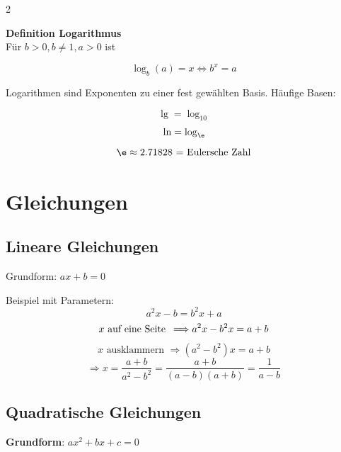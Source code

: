 \begin{multicols}{2}
\begin{tcolorbox}[colback=white]
  \textbf{Definition Logarithmus}\\
  Für $b>0, b\ne 1, a>0$ ist

$$\log_b{}(a)=x \Longleftrightarrow{} b^x = a$$
\end{tcolorbox}

Logarithmen sind Exponenten zu einer fest gewählten Basis. Häufige Basen:

$$\lg = \log_{10} $$
$$\ln = \log_{\e}$$
$$\e \approx 2.71828 \textrm{ = Eulersche Zahl}$$


\begin{tcolorbox}[colback=white]

\end{tcolorbox}%
%

\section*{Gleichungen}
                
\subsection*{Lineare Gleichungen}
Grundform: $ax+b=0$

Beispiel mit Parametern:
$$a^2x-b=b^2x+a$$
$$x\textrm{ auf eine Seite\, } \Longrightarrow a^2x -b^2x = a+b$$
$$x\textrm{ ausklammern }\Longrightarrow (a^2-b^2)x= a+b$$
$$\Longrightarrow x= \frac{a+b}{a^2-b^2} = \frac{a+b}{(a-b)(a+b)}=\frac{1}{a-b}$$

\subsection*{Quadratische Gleichungen}

\textbf{Grundform}: $ax^2 + bx+c = 0$


\end{multicols}
